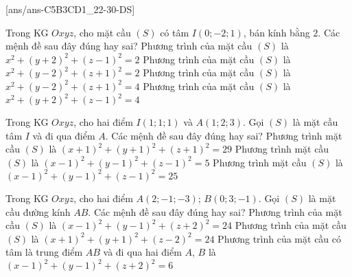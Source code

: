 \TNTF
{}[ans/ans-C5B3CD1_22-30-DS]
\begin{ex}%
Trong KG $Oxyz$, cho mặt cầu $(S)$ có tâm $I(0;-2;1)$, bán kính bằng $ 2 $. Các mệnh đề sau đây đúng hay sai?
\choiceTF
{Phương trình của mặt cầu $(S)$ là $x^2+(y+2)^2+(z-1)^2=2$}
{Phương trình của mặt cầu $(S)$ là $x^2+(y-2)^2+(z+1)^2=2$}
{Phương trình của mặt cầu $(S)$ là $x^2+(y-2)^2+(z+1)^2=4$}
{\True Phương trình của mặt cầu $(S)$ là $x^2+(y+2)^2+(z-1)^2=4$}
\end{ex}
\begin{ex}%
Trong KG $Oxyz$, cho hai điểm $I(1;1;1)$ và $A(1;2;3)$. Gọi $(S)$ là mặt cầu tâm $ I $ và đi qua điểm $ A $. Các mệnh đề sau đây đúng hay sai?
{Phương trình mặt cầu $ (S)$ là $(x+1)^{2}+(y+1)^{2}+(z+1)^{2}=29$}
{\True Phương trình mặt cầu $ (S)$ là $(x-1)^{2}+(y-1)^{2}+(z-1)^{2}=5$}
{Phương trình mặt cầu $ (S) $ là $(x-1)^2+(y-1)^2+(z-1)^2=25$}
\end{ex}
\begin{ex}%
Trong KG $Oxyz$, cho hai điểm $A(2;-1;-3)$; $B(0;3;-1)$. Gọi $ (S) $ là mặt cầu đường kính $ AB $. Các mệnh đề sau đây đúng hay sai?
{Phương trình của mặt cầu $ (S) $ là $(x-1)^2+(y-1)^2+(z+2)^2=24$}
{Phương trình của mặt cầu $ (S) $ là $(x+1)^2+(y+1)^2+(z-2)^2=24$}
{\True Phương trình của mặt cầu có tâm là trung điểm $AB$ và đi qua hai điểm $A$, $B$ là $(x-1)^2+(y-1)^2+(z+2)^2=6$}
\end{ex}

